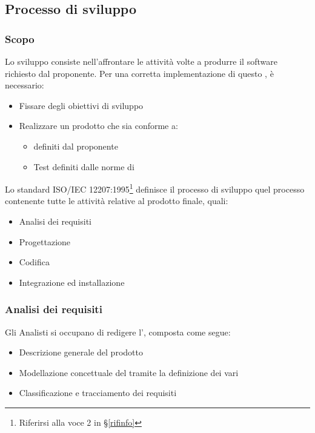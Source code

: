     \subsection{Processo di sviluppo}\label{PP:Sviluppo}

		\subsubsection{Scopo}\label{PP:Sviluppo:Scopo}
		Lo sviluppo consiste nell'affrontare le attività volte a produrre il software richiesto dal proponente.
		Per una corretta implementazione di questo , è necessario:
		\begin{itemize}
			\item Fissare degli obiettivi di sviluppo
			\item Realizzare un prodotto che sia conforme a:
			\begin{itemize}
				\item {} definiti dal proponente
				\item Test definiti dalle norme di 
			\end{itemize}
		\end{itemize}
		Lo standard ISO/IEC 12207:1995\footnote{Riferirsi alla voce
		2
		 in \S\ref{rifinfo}} definisce il processo di
		sviluppo quel processo contenente tutte le attività relative al prodotto finale, quali:
		\begin{itemize} %
			\item Analisi dei requisiti
			\item Progettazione
			\item Codifica
			\item Integrazione ed installazione
		\end{itemize}


        \subsubsection{Analisi dei requisiti}\label{PP:Sviluppo:AdR}
		Gli Analisti si occupano di redigere l'\Doc{\AdRv}, composta come segue:
		\begin{itemize}
			\item Descrizione generale del prodotto
			\item Modellazione concettuale del  tramite la definizione dei vari 
			\item Classificazione e tracciamento dei requisiti
		\end{itemize}

